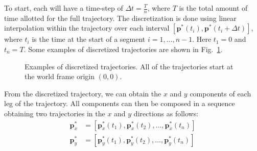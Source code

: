 \documentclass[letterpaper, 10 pt, conference]{ieeeconf}  %
\newcommand\NB[1]{$\spadesuit$\footnote{NB: #1}}
\begin{document}
To start, each will have a time-step of $\Delta t = \frac{T}{n}$, where $T$ is the total amount of time allotted for the full trajectory. The discretization is done using linear interpolation within the trajectory over each interval $[\bm{p}^*(t_i), \bm{p}^*(t_i+\Delta t)]$, where $t_i$ is the time at the start of a segment $i=1, \ldots, n-1$. Here $t_1=0$ and $t_n=T$. 
Some examples of discretized trajectories are shown in Fig.~\ref{fig:trajs}. 
\begin{figure}[h]
	\centering
	\caption{Examples of discretized trajectories. All of the trajectories start at the world frame origin $(0,0)$.}
	\label{fig:trajs}
\end{figure}

From the discretized trajectory, we can obtain the $x$ and $y$ components of each leg of the trajectory. All components can then be composed in a sequence obtaining two trajectories in the $x$ and $y$ directions as follows:
\begin{align}
    \bm{p}_x^*&=\left[ \bm{p}_x^*(t_1), \bm{p}_x^*(t_2), \ldots, \bm{p}_x^*(t_{n})\right] \nonumber \\
    \bm{p}_y^*&=\left[ \bm{p}_y^*(t_1), \bm{p}_y^*(t_2), \ldots, \bm{p}_y^*(t_{n})\right]
\end{align}
\end{document}
